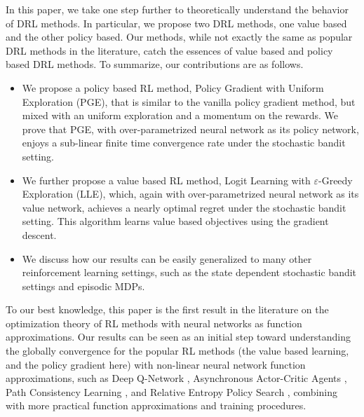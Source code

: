 In this paper, we take one step further to theoretically understand the behavior of DRL methods. In particular, we propose two DRL methods, one value based and the other policy based. Our methods, while not exactly the same as popular DRL methods in the literature, catch the essences of value based and policy based DRL methods. To summarize, our contributions are as follows.
\begin{itemize}
	\item We propose a policy based RL method, Policy Gradient with Uniform Exploration (PGE), that is similar to the vanilla policy gradient method, but mixed with an uniform exploration and a momentum on the rewards. We prove that PGE, with over-parametrized neural network as its policy network, enjoys a sub-linear finite time convergence rate under the stochastic bandit setting.
	\item We further propose a value based RL method, Logit Learning with $\varepsilon$-Greedy Exploration (LLE), which, again with over-parametrized neural network as its value network, achieves a nearly optimal regret under the stochastic bandit setting. This algorithm learns value based objectives using the gradient descent. 
	\item We discuss how our results can be easily generalized to many other reinforcement learning settings, such as the state dependent stochastic bandit settings and episodic MDPs.
\end{itemize}

To our best knowledge, this paper is the first result in the literature on the optimization theory of RL methods with neural networks as function approximations. Our results can be seen as an initial step toward understanding the globally convergence for the popular RL methods (the value based learning, and the policy gradient here) with non-linear neural network function approximations, such as Deep Q-Network \cite{mnih2015human}, Asynchronous Actor-Critic Agents \citep{mnih2016asynchronous}, Path Consistency Learning \citep{nachum2017bridging}, and Relative Entropy Policy Search \citep{peters2010relative}, combining with more practical function approximations and training procedures.


